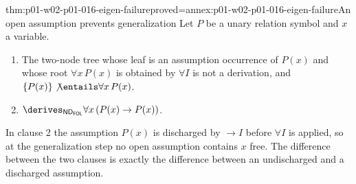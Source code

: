 \begin{hbtheorem}{thm:p01-w02-p01-016-eigen-failure}{proved=annex:p01-w02-p01-016-eigen-failure}{An open assumption prevents generalization}
Let \(P\) be a unary relation symbol and \(x\) a variable.
\begin{enumerate}
  \item The two-node tree whose leaf is an assumption occurrence of
        \(P(x)\) and whose root \(\forall x\,P(x)\) is obtained by
        \(\forall I\) is not a derivation, and
        \(\{P(x)\}\not\entails\forall x\,P(x)\).
  \item \(\derives_{\mathsf{ND}_{\mathsf{FOL}}}\forall x\,(P(x)\to P(x))\).
\end{enumerate}
\end{hbtheorem}

In clause 2 the assumption \(P(x)\) is discharged by \(\to I\) before
\(\forall I\) is applied, so at the generalization step no open assumption
contains \(x\) free. The difference between the two clauses is exactly the
difference between an undischarged and a discharged assumption.

